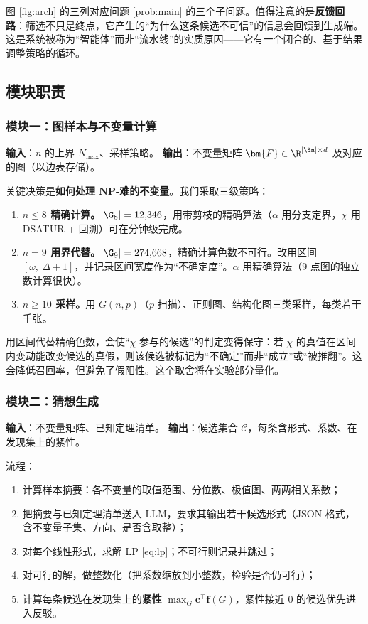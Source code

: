 图 \ref{fig:arch} 的三列对应问题 \ref{prob:main} 的三个子问题。值得注意的是\textbf{反馈回路}：筛选不只是终点，它产生的“为什么这条候选不可信”的信息会回馈到生成端。这是系统被称为“智能体”而非“流水线”的实质原因——它有一个闭合的、基于结果调整策略的循环。

\subsection{模块职责}
\label{sec:r-modules}

\subsubsection{模块一：图样本与不变量计算}

\textbf{输入}：$n$ 的上界 $N_{\max}$、采样策略。
\textbf{输出}：不变量矩阵 $\bm{F}\in\R^{|\Sn|\times d}$ 及对应的图（以边表存储）。

关键决策是\textbf{如何处理 NP-难的不变量}。我们采取三级策略：

\begin{enumerate}[label=(\arabic*)]
  \item \textbf{$n\le 8$ 精确计算。}$|\G_8|=12{,}346$，用带剪枝的精确算法（$\alpha$ 用分支定界，$\chi$ 用 DSATUR + 回溯）可在分钟级完成。
  \item \textbf{$n=9$ 用界代替。}$|\G_9|=274{,}668$，精确计算色数不可行。改用区间 $[\omega,\ \Delta+1]$，并记录区间宽度作为“不确定度”。$\alpha$ 用精确算法（9 点图的独立数计算很快）。
  \item \textbf{$n\ge 10$ 采样。}用 $G(n,p)$（$p$ 扫描）、正则图、结构化图三类采样，每类若干千张。
\end{enumerate}

\begin{notebox}[一个需要报告的取舍]
用区间代替精确色数，会使“$\chi$ 参与的候选”的判定变得保守：若 $\chi$ 的真值在区间内变动能改变候选的真假，则该候选被标记为“不确定”而非“成立”或“被推翻”。这会降低召回率，但避免了假阳性。这个取舍将在实验部分量化。
\end{notebox}

\subsubsection{模块二：猜想生成}

\textbf{输入}：不变量矩阵、已知定理清单。
\textbf{输出}：候选集合 $\mathcal{C}$，每条含形式、系数、在发现集上的紧性。

流程：
\begin{enumerate}[label=\arabic*.]
  \item 计算样本摘要：各不变量的取值范围、分位数、极值图、两两相关系数；
  \item 把摘要与已知定理清单送入 LLM，要求其输出若干候选形式（JSON 格式，含不变量子集、方向、是否含取整）；
  \item 对每个线性形式，求解 LP \eqref{eq:lp}；不可行则记录并跳过；
  \item 对可行的解，做整数化（把系数缩放到小整数，检验是否仍可行）；
  \item 计算每条候选在发现集上的\textbf{紧性} $\max_G \bm{c}^\top\bm{f}(G)$，紧性接近 $0$ 的候选优先进入反驳。
\end{enumerate}

